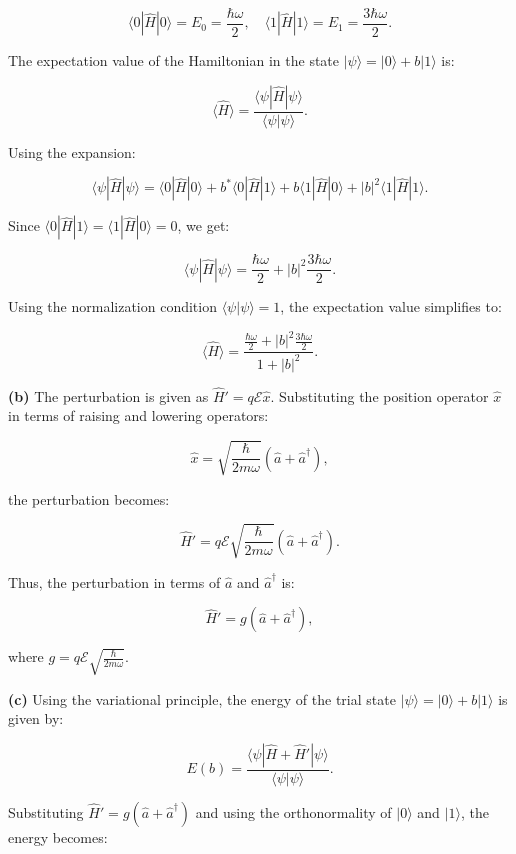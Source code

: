 \[
\langle 0 | \hat{H} | 0 \rangle = E_0 = \frac{\hbar \omega}{2}, \quad \langle 1 | \hat{H} | 1 \rangle = E_1 = \frac{3 \hbar \omega}{2}.
\]

The expectation value of the Hamiltonian in the state \(|\psi\rangle = |0\rangle + b|1\rangle\) is:

\[
\langle \hat{H} \rangle = \frac{\langle \psi | \hat{H} | \psi \rangle}{\langle \psi | \psi \rangle}.
\]

Using the expansion:

\[
\langle \psi | \hat{H} | \psi \rangle = \langle 0 | \hat{H} | 0 \rangle + b^* \langle 0 | \hat{H} | 1 \rangle + b \langle 1 | \hat{H} | 0 \rangle + |b|^2 \langle 1 | \hat{H} | 1 \rangle.
\]

Since \(\langle 0 | \hat{H} | 1 \rangle = \langle 1 | \hat{H} | 0 \rangle = 0\), we get:

\[
\langle \psi | \hat{H} | \psi \rangle = \frac{\hbar \omega}{2} + |b|^2 \frac{3 \hbar \omega}{2}.
\]

Using the normalization condition \(\langle \psi | \psi \rangle = 1\), the expectation value simplifies to:

\[
\langle \hat{H} \rangle = \frac{\frac{\hbar \omega}{2} + |b|^2 \frac{3 \hbar \omega}{2}}{1 + |b|^2}.
\]

\textbf{(b)} The perturbation is given as \(\hat{H}' = q \mathcal{E} \hat{x}\). Substituting the position operator \(\hat{x}\) in terms of raising and lowering operators:

\[
\hat{x} = \sqrt{\frac{\hbar}{2m\omega}} (\hat{a} + \hat{a}^\dagger),
\]

the perturbation becomes:

\[
\hat{H}' = q \mathcal{E} \sqrt{\frac{\hbar}{2m\omega}} (\hat{a} + \hat{a}^\dagger).
\]

Thus, the perturbation in terms of \(\hat{a}\) and \(\hat{a}^\dagger\) is:

\[
\hat{H}' = g (\hat{a} + \hat{a}^\dagger),
\]

where \(g = q \mathcal{E} \sqrt{\frac{\hbar}{2m\omega}}\).

\textbf{(c)} Using the variational principle, the energy of the trial state \(|\psi\rangle = |0\rangle + b|1\rangle\) is given by:

\[
E(b) = \frac{\langle \psi | \hat{H} + \hat{H}' | \psi \rangle}{\langle \psi | \psi \rangle}.
\]

Substituting \(\hat{H}' = g (\hat{a} + \hat{a}^\dagger)\) and using the orthonormality of \(|0\rangle\) and \(|1\rangle\), the energy becomes:

